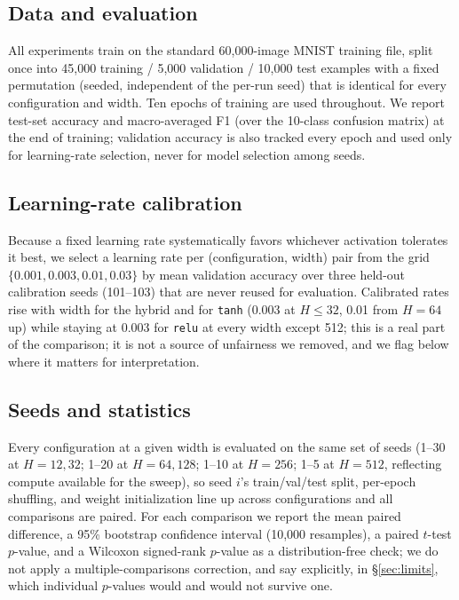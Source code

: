 \documentclass[9pt]{extarticle}
\begin{document}
\subsection{Data and evaluation}
All experiments train on the standard 60,000-image MNIST training file, split
once into 45,000 training / 5,000 validation / 10,000 test examples with a
fixed permutation (seeded, independent of the per-run seed) that is identical
for every configuration and width. Ten epochs of training are used
throughout. We report test-set accuracy and macro-averaged F1 (over the
10-class confusion matrix) at the end of training; validation accuracy is
also tracked every epoch and used only for learning-rate selection, never for
model selection among seeds.

\subsection{Learning-rate calibration}
Because a fixed learning rate systematically favors whichever activation
tolerates it best, we select a learning rate per (configuration, width) pair
from the grid \(\{0.001, 0.003, 0.01, 0.03\}\) by mean validation accuracy
over three held-out calibration seeds (101--103) that are never reused for
evaluation. Calibrated rates rise with width for the hybrid and for
\texttt{tanh} (0.003 at \(H{\le}32\), 0.01 from \(H{=}64\) up) while staying
at 0.003 for \texttt{relu} at every width except 512; this is a real part of
the comparison; it is not a source of unfairness we removed, and we flag
below where it matters for interpretation.

\subsection{Seeds and statistics}
Every configuration at a given width is evaluated on the same set of seeds
(1--30 at \(H{=}12,32\); 1--20 at \(H{=}64,128\); 1--10 at \(H{=}256\); 1--5
at \(H{=}512\), reflecting compute available for the sweep), so seed \(i\)'s
train/val/test split, per-epoch shuffling, and weight initialization line up
across configurations and all comparisons are paired. For each comparison we
report the mean paired difference, a 95\% bootstrap confidence interval
(10,000 resamples), a paired \(t\)-test \(p\)-value, and a Wilcoxon
signed-rank \(p\)-value as a distribution-free check; we do not apply a
multiple-comparisons correction, and say explicitly, in \S\ref{sec:limits},
which individual \(p\)-values would and would not survive one.
\end{document}
